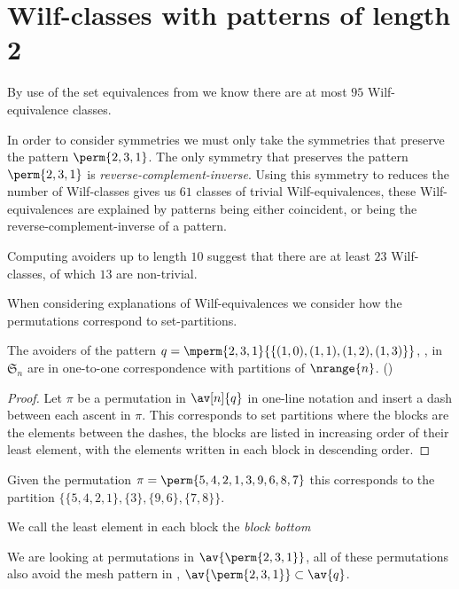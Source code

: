 \section{Wilf-classes with patterns of length 2}
By use of the set equivalences from  we know there are
at most \(95\) Wilf-equivalence classes.

In order to consider symmetries we must only take the symmetries that preserve
the pattern \(\perm{2,3,1}\). The only symmetry that preserves the pattern
\(\perm{2,3,1}\) is \emph{reverse-complement-inverse}. Using this
symmetry to reduces the number of Wilf-classes gives us \(61\) classes of trivial
Wilf-equivalences, these Wilf-equivalences are explained by patterns being either
coincident, or being the reverse-complement-inverse of a pattern.

Computing avoiders up to length \(10\) suggest that there are at least \(23\)
Wilf-classes, of which \(13\) are non-trivial.

When considering explanations of Wilf-equivalences we consider how the
permutations correspond to set-partitions.

\begin{note}
    \label{not:setequiv}
    The avoiders of the pattern \(q = \mperm{2,3,1}{\{(1,0),(1,1),(1,2),(1,3)\}}\),
    ,
    in \(\mathfrak{S}_n\) are in one-to-one correspondence with partitions of
    \(\nrange{n}\). (\textcite[Prop.~2]{DBLP:journals/ejc/Claesson01})
\end{note}
\begin{proof}
    Let \(\pi\) be a permutation in \(\av[n]{q}\)
    in one-line notation and insert a dash between each ascent in \(\pi\). This
    corresponds to set partitions where the blocks are the elements between the
    dashes, the blocks are listed in increasing order of their least element,
    with the elements written in each block in descending order.
\end{proof}

\begin{example}
    Given the permutation \(\pi = \perm{5,4,2,1,3,9,6,8,7}\) this corresponds to the
    partition \(\{\{5,4,2,1\},\{3\},\{9,6\},\{7,8\}\}\).
\end{example}

We call the least element in each block the \emph{block bottom}

We are looking at permutations in \(\av{\perm{2,3,1}}\), all of these permutations
also avoid the mesh pattern in , \ie
\(\av{\perm{2,3,1}} \subset \av{q}\).

